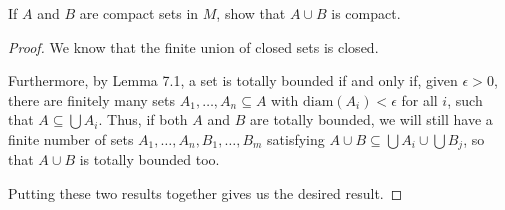 \begin{exercise}{4}
If $A$ and $B$ are compact sets in $M$, show that $A\cup B$ is compact.
\end{exercise}
\begin{proof}
We know that the finite union of closed sets is closed.

Furthermore, by Lemma 7.1, a set is totally bounded if and only if, given $\epsilon>0$, there are finitely many sets $A_1,\dots,A_n\subseteq A$ with $\text{diam}(A_i)<\epsilon$ for all $i$, such that $A\subseteq\bigcup A_i$.
Thus, if both $A$ and $B$ are totally bounded, we will still have a finite number of sets $A_1,\dots,A_n,B_1,\dots, B_m$ satisfying $A\cup B\subseteq \bigcup A_i \cup \bigcup B_j$, so that $A\cup B$ is totally bounded too.

Putting these two results together gives us the desired result.
\end{proof} 

